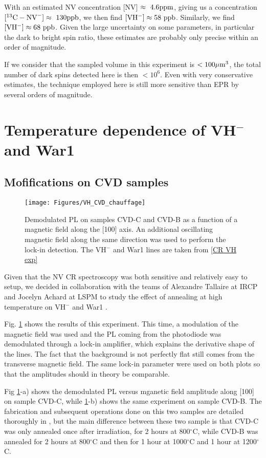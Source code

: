 \documentclass[a4paper,11pt]{report}
\begin{document}
With an estimated NV concentration [NV] $\approx\ \rm 4.6 ppm$, giving us a concentration $[^{13}\rm{C-NV}^-]\approx \ \rm 130 ppb$, we then find $[\rm VH^-] \approx 58\ \rm ppb$. Similarly, we find $[\rm VH^-] \approx 68\ \rm ppb$. Given the large uncertainty on some parameters, in particular the dark to bright spin ratio, these estimates are probably only precise within an order of magnitude.

If we consider that the sampled volume in this experiment is $< 100 \mu \rm{m}^3$, the total number of dark spins detected here is then $< 10^6$. Even with very conservative estimates, the technique employed here is still more sensitive than EPR by several orders of magnitude.

\section{Temperature dependence of VH$^-$ and War1}


\subsection{Mofifications on CVD samples}
\begin{figure}[h]
\centering
\texttt{[image: Figures/VH\_CVD\_chauffage]}
\caption{Demodulated PL on samples CVD-C and CVD-B as a function of a magnetic field along the [100] axis. An additional oscillating magnetic field along the same direction was used to perform the lock-in detection. The VH$^-$ and War1 lines are taken from \ref{CR VH exp}}
\label{chauffage CVD}
\end{figure}

Given that the NV CR spectroscopy was both sensitive and relatively easy to setup, we decided in collaboration with the teams of Alexandre Tallaire at IRCP and Jocelyn Achard at LSPM to study the effect of annealing at high temperature on VH$^-$ and War1 \citep{ngambou2022improving}.

Fig. \ref{chauffage CVD} shows the results of this experiment. This time, a modulation of the magnetic field was used and the PL coming from the photodiode was demodulated through a lock-in amplifier, which explains the derivative shape of the lines. The fact that the background is not perfectly flat still comes from the transverse magnetic field. The same lock-in parameter were used on both plots so that the amplitudes should in theory be comparable.

Fig \ref{chauffage CVD}-a) shows the demodulated PL versus mganetic field amplitude along [100] on sample CVD-C, while \ref{chauffage CVD}-b) shows the same experiment on sample CVD-B. The fabrication and subsequent operations done on this two samples are detailed thoroughly in \citep{ngambou2022improving}, but the main difference between these two sample is that CVD-C was only annealed once after irradiation, for 2 hours at 800$^\circ$C, while CVD-B was annealed for 2 hours at 800$^\circ$C and then for 1 hour at 1000$^\circ$C and 1 hour at 1200$^\circ$C.
\end{document}
